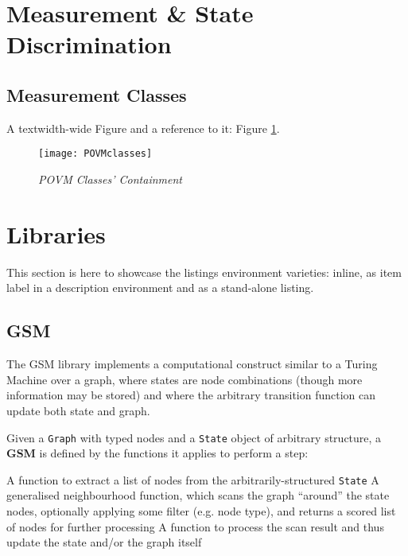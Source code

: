 \documentclass[a4paper,12pt]{article}
\begin{document}
 \section{Measurement \& State Discrimination}
\label{sec:MeasurAndStateDiscr}


\subsection{Measurement Classes}
\label{sec:SubPOVMclasses}

A textwidth-wide Figure and a reference to it: Figure \ref{fig:POVMclasses}.

\begin{figure}\centering
    \texttt{[image: POVMclasses]}
    \caption{\it POVM Classes' Containment}
    \label{fig:POVMclasses}
\end{figure}


 \section{Libraries}
\label{sec:Libraries}

This section is here to showcase the listings environment varieties:
inline, as item label in a description environment and as a stand-alone listing. 



\subsection{GSM}
\label{sec:Sub_GSM}

The \acrlong{GSM} library \cite{GSM} implements a computational construct similar to a Turing Machine over a graph,
where states are node combinations (though more information may be stored) and where the arbitrary transition function
can update both state and graph.

\begin{defn}\label{def:GSM}
Given a \lstinline{Graph} with typed nodes and a \lstinline{State} object of arbitrary structure,
a \textbf{\gls{GSM}} is defined by the functions it applies to perform a step:
\begin{description}[noitemsep]
     A function to extract a list of nodes from the arbitrarily-structured \lstinline{State} 
     A generalised neighbourhood function, which scans the graph ``around'' the state nodes, 
            optionally applying some filter (e.g. node type), and returns a scored list of nodes for further processing
     A function to process the scan result and thus update the state and/or the graph itself
\end{description}
\end{defn}
\end{document}
